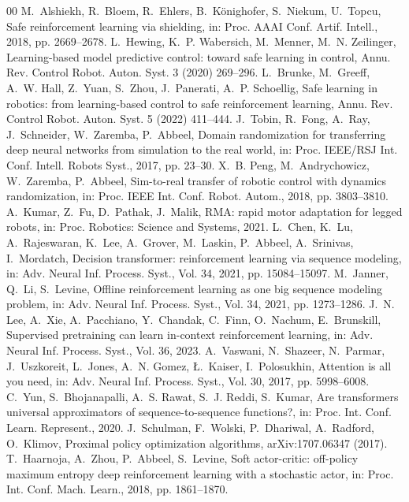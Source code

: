 \begin{thebibliography}{00}
 M.~Alshiekh, R.~Bloem, R.~Ehlers, B.~K\"onighofer, S.~Niekum, U.~Topcu, Safe reinforcement learning via shielding, in: Proc. AAAI Conf. Artif. Intell., 2018, pp. 2669--2678.
 L.~Hewing, K.~P. Wabersich, M.~Menner, M.~N. Zeilinger, Learning-based model predictive control: toward safe learning in control, Annu. Rev. Control Robot. Auton. Syst. 3 (2020) 269--296.
 L.~Brunke, M.~Greeff, A.~W. Hall, Z.~Yuan, S.~Zhou, J.~Panerati, A.~P. Schoellig, Safe learning in robotics: from learning-based control to safe reinforcement learning, Annu. Rev. Control Robot. Auton. Syst. 5 (2022) 411--444.
 J.~Tobin, R.~Fong, A.~Ray, J.~Schneider, W.~Zaremba, P.~Abbeel, Domain randomization for transferring deep neural networks from simulation to the real world, in: Proc. IEEE/RSJ Int. Conf. Intell. Robots Syst., 2017, pp. 23--30.
 X.~B. Peng, M.~Andrychowicz, W.~Zaremba, P.~Abbeel, Sim-to-real transfer of robotic control with dynamics randomization, in: Proc. IEEE Int. Conf. Robot. Autom., 2018, pp. 3803--3810.
 A.~Kumar, Z.~Fu, D.~Pathak, J.~Malik, RMA: rapid motor adaptation for legged robots, in: Proc. Robotics: Science and Systems, 2021.
 L.~Chen, K.~Lu, A.~Rajeswaran, K.~Lee, A.~Grover, M.~Laskin, P.~Abbeel, A.~Srinivas, I.~Mordatch, Decision transformer: reinforcement learning via sequence modeling, in: Adv. Neural Inf. Process. Syst., Vol. 34, 2021, pp. 15084--15097.
 M.~Janner, Q.~Li, S.~Levine, Offline reinforcement learning as one big sequence modeling problem, in: Adv. Neural Inf. Process. Syst., Vol. 34, 2021, pp. 1273--1286.
 J.~N. Lee, A.~Xie, A.~Pacchiano, Y.~Chandak, C.~Finn, O.~Nachum, E.~Brunskill, Supervised pretraining can learn in-context reinforcement learning, in: Adv. Neural Inf. Process. Syst., Vol. 36, 2023.
 A.~Vaswani, N.~Shazeer, N.~Parmar, J.~Uszkoreit, L.~Jones, A.~N. Gomez, {\L}.~Kaiser, I.~Polosukhin, Attention is all you need, in: Adv. Neural Inf. Process. Syst., Vol. 30, 2017, pp. 5998--6008.
 C.~Yun, S.~Bhojanapalli, A.~S. Rawat, S.~J. Reddi, S.~Kumar, Are transformers universal approximators of sequence-to-sequence functions?, in: Proc. Int. Conf. Learn. Represent., 2020.
 J.~Schulman, F.~Wolski, P.~Dhariwal, A.~Radford, O.~Klimov, Proximal policy optimization algorithms, arXiv:1707.06347 (2017).
 T.~Haarnoja, A.~Zhou, P.~Abbeel, S.~Levine, Soft actor-critic: off-policy maximum entropy deep reinforcement learning with a stochastic actor, in: Proc. Int. Conf. Mach. Learn., 2018, pp. 1861--1870.

\end{thebibliography}
